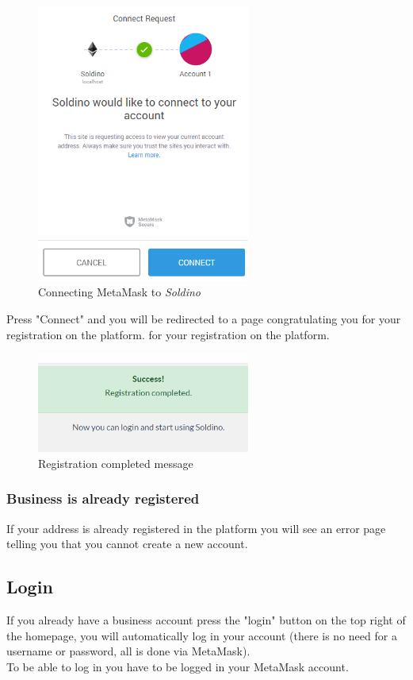 	\begin{figure}[H]
		\includegraphics[width=7cm]{res/images/metamask_connect.png}
		\centering
		\caption{Connecting MetaMask to \textit{Soldino}}
	\end{figure}
	\noindent \noindent Press "Connect" and you will be redirected to a page 
	congratulating you for your registration on the platform.
	for your registration on the platform.
	\begin{figure}[H]
		\includegraphics[width=7cm]{res/images/registration_complete.png}
		\centering
		\caption{Registration completed message}
	\end{figure}
	\subsubsection{Business is already registered}
	If your address is already registered in the platform you will see an
	error page telling you that you cannot create a new account.
	\subsection{Login}
	If you already have a business account press the "login" button on the 
	top right of the homepage, you will automatically log in your account 
	(there is no need for a username or password, all is done via MetaMask). 
	\\To be able to log in you have to be logged in your MetaMask account.
